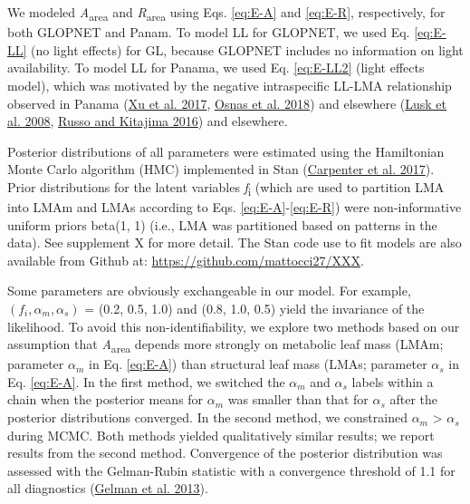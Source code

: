 \documentclass[
  12pt,
]{article}
\begin{document}
We modeled \emph{A}\textsubscript{area} and \emph{R}\textsubscript{area} using Eqs. \eqref{eq:E-A} and \eqref{eq:E-R}, respectively, for both GLOPNET and Panam.
To model LL for GLOPNET, we used Eq. \eqref{eq:E-LL} (no light effects) for GL, because GLOPNET includes no information on light availability.
To model LL for Panama, we used Eq. \eqref{eq:E-LL2} (light effects model), which was motivated by the negative intraspecific LL-LMA relationship observed in Panama (\protect\hyperlink{ref-Xu2017}{Xu et al. 2017}, \protect\hyperlink{ref-Osnas2018}{Osnas et al. 2018}) and elsewhere (\protect\hyperlink{ref-Lusk2008}{Lusk et al. 2008}, \protect\hyperlink{ref-Russo2016}{Russo and Kitajima 2016}) and elsewhere.

Posterior distributions of all parameters were estimated using the Hamiltonian Monte Carlo algorithm (HMC) implemented in Stan (\protect\hyperlink{ref-Carpenter2017}{Carpenter et al. 2017}).
Prior distributions for the latent variables \emph{f}\textsubscript{i} (which are used to partition LMA into LMAm and LMAs according to Eqs. \eqref{eq:E-A}-\eqref{eq:E-R}) were non-informative uniform priors beta(1, 1) (i.e., LMA was partitioned based on patterns in the data). See supplement X for more detail.
The Stan code use to fit models are also available from Github at: \href{https://github.com/mattocci27/LMAmLMAs}{https://github.com/mattocci27/XXX}.

Some parameters are obviously exchangeable in our model.
For example, \((f_i, \alpha_m, \alpha_s)\) = (0.2, 0.5, 1.0) and (0.8, 1.0, 0.5) yield the invariance of the likelihood.
To avoid this non-identifiability, we explore two methods based on our assumption that \emph{A}\textsubscript{area} depends more strongly on metabolic leaf mass (LMAm; parameter \(\alpha_m\) in Eq. \eqref{eq:E-A}) than structural leaf mass (LMAs; parameter \(\alpha_s\) in Eq. \eqref{eq:E-A}.
In the first method, we switched the \(\alpha_m\) and \(\alpha_s\) labels within a chain when the posterior means for \(\alpha_m\) was smaller than that for \(\alpha_s\) after the posterior distributions converged.
In the second method, we constrained \(\alpha_m\) \textgreater{} \(\alpha_s\) during MCMC.
Both methods yielded qualitatively similar results; we report results from the second method.
Convergence of the posterior distribution was assessed with the Gelman-Rubin statistic with a convergence threshold of 1.1 for all diagnostics (\protect\hyperlink{ref-Gelman2013}{Gelman et al. 2013}).
\end{document}
